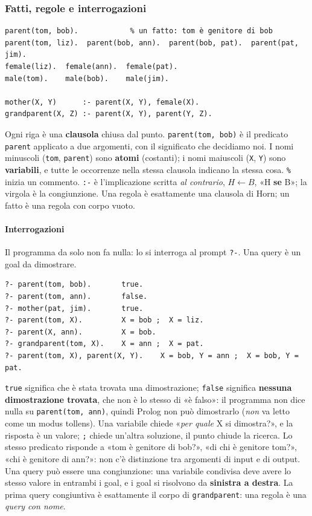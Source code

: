 \documentclass[a4paper,12pt]{article}
\begin{document}
\subsubsection{Fatti, regole e interrogazioni}
\begin{verbatim}
parent(tom, bob).            % un fatto: tom è genitore di bob
parent(tom, liz).  parent(bob, ann).  parent(bob, pat).  parent(pat, jim).
female(liz).  female(ann).  female(pat).
male(tom).    male(bob).    male(jim).

mother(X, Y)      :- parent(X, Y), female(X).
grandparent(X, Z) :- parent(X, Y), parent(Y, Z).
\end{verbatim}
Ogni riga è una \textbf{clausola} chiusa dal punto. \texttt{parent(tom, bob)} è il predicato
\texttt{parent} applicato a due argomenti, con il significato che decidiamo noi. I nomi minuscoli
(\texttt{tom}, \texttt{parent}) sono \textbf{atomi} (costanti); i nomi maiuscoli (\texttt{X},
\texttt{Y}) sono \textbf{variabili}, e tutte le occorrenze nella stessa clausola indicano la
stessa cosa. \texttt{\%} inizia un commento. \texttt{:-} è l'implicazione scritta \emph{al
contrario}, $H \leftarrow B$, «H \textbf{se} B»; la virgola è la congiunzione. Una regola è
esattamente una clausola di Horn; un fatto è una regola con corpo vuoto.

\paragraph{Interrogazioni} Il programma da solo non fa nulla: lo si interroga al prompt
\texttt{?-}. Una query è un goal da dimostrare.
\begin{verbatim}
?- parent(tom, bob).       true.
?- parent(tom, ann).       false.
?- mother(pat, jim).       true.
?- parent(tom, X).         X = bob ;  X = liz.
?- parent(X, ann).         X = bob.
?- grandparent(tom, X).    X = ann ;  X = pat.
?- parent(tom, X), parent(X, Y).    X = bob, Y = ann ;  X = bob, Y = pat.
\end{verbatim}
\texttt{true} significa che è stata trovata una dimostrazione; \texttt{false} significa
\textbf{nessuna dimostrazione trovata}, che non è lo stesso di «è falso»: il programma non dice
nulla su \texttt{parent(tom, ann)}, quindi Prolog non può dimostrarlo (\emph{non} va letto come un
modus tollens). Una variabile chiede «\emph{per quale} X si dimostra?», e la risposta è un valore;
\texttt{;} chiede un'altra soluzione, il punto chiude la ricerca. Lo stesso predicato risponde a
«tom è genitore di bob?», «di chi è genitore tom?», «chi è genitore di ann?»: non c'è distinzione
tra argomenti di input e di output. Una query può essere una congiunzione: una variabile
condivisa deve avere lo stesso valore in entrambi i goal, e i goal si risolvono da
\textbf{sinistra a destra}. La prima query congiuntiva è esattamente il corpo di
\texttt{grandparent}: una regola è una \emph{query con nome}.
\end{document}
